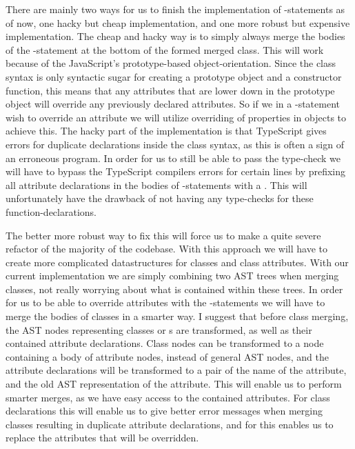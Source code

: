 There are mainly two ways for us to finish the implementation of -statements as of now, one hacky but cheap implementation, and one more robust but expensive implementation.
The cheap and hacky way is to simply always merge the bodies of the -statement at the bottom of the formed merged class.
This will work because of the JavaScript's prototype-based object-orientation.
Since the class syntax is only syntactic sugar for creating a prototype object and a constructor function, this means that any attributes that are lower down in the prototype object will override any previously declared attributes.
So if we in a -statement wish to override an attribute we will utilize overriding of properties in objects to achieve this.
The hacky part of the implementation is that TypeScript gives errors for duplicate declarations inside the class syntax, as this is often a sign of an erroneous program.
In order for us to still be able to pass the type-check we will have to bypass the TypeScript compilers errors for certain lines by prefixing all attribute declarations in the bodies of -statements with a .
This will unfortunately have the drawback of not having any type-checks for these function-declarations.

The better more robust way to fix this will force us to make a quite severe refactor of the majority of the codebase.
With this approach we will have to create more complicated datastructures for classes and class attributes.
With our current implementation we are simply combining two AST trees when merging classes, not really worrying about what is contained within these trees.
In order for us to be able to override attributes with the -statements we will have to merge the bodies of classes in a smarter way.
I suggest that before class merging, the AST nodes representing classes or s are transformed, as well as their contained attribute declarations.
Class nodes can be transformed to a node containing a body of attribute nodes, instead of general AST nodes, and the attribute declarations will be transformed to a pair of the name of the attribute, and the old AST representation of the attribute.
This will enable us to perform smarter merges, as we have easy access to the contained attributes.
For class declarations this will enable us to give better error messages when merging classes resulting in duplicate attribute declarations, and for  this enables us to replace the attributes that will be overridden.

